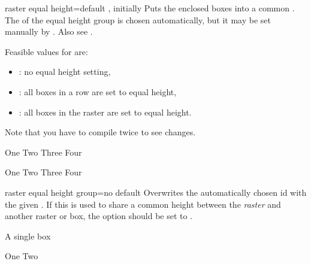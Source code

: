 \clearpage
\begin{docTcbKey}[][doc new and updated={2014-11-10}{2017-02-28}]{raster equal height}{=}{default , initially }
  Puts the enclosed boxes into a common .
  The  of the equal height group is chosen automatically, but
  it may be set manually by .
  Also see .

  Feasible values for  are:
  \begin{itemize}
  \item{}: no equal height setting,
  \item{}: all boxes in a row are set to equal height,
  \item{}: all boxes in the raster are set to equal height.
  \end{itemize}
  Note that you have to compile twice to see changes.

\begin{dispExample}
\begin{tcbitemize}[raster equal height=rows,
  size=small,colframe=red!50!black,colback=red!10!white]
  \tcbitem One
  \tcbitem \Huge Two
  \tcbitem Three
  \tcbitem Four
\end{tcbitemize}
\end{dispExample}
\begin{dispExample}
\begin{tcbitemize}[raster equal height,
  size=small,colframe=red!50!black,colback=red!10!white]
  \tcbitem One
  \tcbitem \Huge Two
  \tcbitem Three
  \tcbitem Four
\end{tcbitemize}
\end{dispExample}
\end{docTcbKey}


\begin{docTcbKey}[][doc new=2014-11-10]{raster equal height group}{=}{no default}
  Overwrites the automatically chosen id with the given .
  If this is used to share a common height between the \emph{raster} and
  another raster or box, the  option
  should be set to .
\begin{dispExample}
\begin{tcolorbox}[equal height group=raster-manual-id]
  A single box
\end{tcolorbox}
\begin{tcbitemize}[raster equal height,raster equal height group=raster-manual-id]
  \tcbitem One
  \tcbitem \Huge Two
\end{tcbitemize}
\end{dispExample}
\end{docTcbKey}


